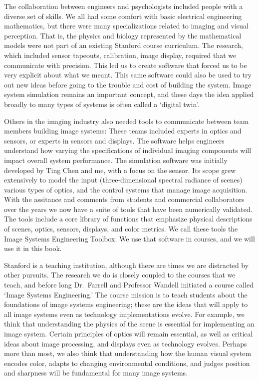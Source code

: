 \documentclass[
  letterpaper,
]{book}
\begin{document}
The collaboration between engineers and psychologists included people
with a diverse set of skills. We all had some comfort with basic
electrical engineering mathematics, but there were many specializations
related to imaging and visual perception. That is, the physics and
biology represented by the mathematical models were not part of an
existing Stanford course curriculum. The research, which included sensor
tapeouts, calibration, image display, required that we communicate with
precision. This led us to create software that forced us to be very
explicit about what we meant. This same software could also be used to
try out new ideas before going to the trouble and cost of building the
system. Image system simulation remains an important concept, and these
days the idea applied broadly to many types of systems is often called a
`digital twin'.

Others in the imaging industry also needed tools to communicate between
team members building image systems: These teams included experts in
optics and sensors, or experts in sensors and displays. The software
helps engineers understand how varying the specifications of individual
imaging components will impact overall system performance. The
simulation software was initially developed by Ting Chen and me, with a
focus on the sensor. Its scope grew extensively to model the input
(three-dimensional spectral radiance of scenes) various types of optics,
and the control systems that manage image acquisition. With the
assitance and comments from students and commercial collaborators over
the years we now have a suite of tools that have been numerically
validated. The tools include a core library of functions that emphasize
physical descriptions of scenes, optics, sensors, displays, and color
metrics. We call these tools the Image Systems Engineering Toolbox. We
use that software in courses, and we will use it in this book.

Stanford is a teaching institution, although there are times we are
distracted by other pursuits. The research we do is closely coupled to
the courses that we teach, and before long Dr.~Farrell and Professor
Wandell initiated a course called `Image Systems Engineering.' The
course mission is to teach students about the foundations of image
systems engineering; these are the ideas that will apply to all image
systems even as technology implementations evolve. For example, we think
that understanding the physics of the scene is essential for
implementing an image system. Certain principles of optics will remain
essential, as well as critical ideas about image processing, and
displays even as technology evolves. Perhaps more than most, we also
think that understanding how the human visual system encodes color,
adapts to changing environmental conditions, and judges position and
sharpness will be fundamental for many image systems.
\end{document}
